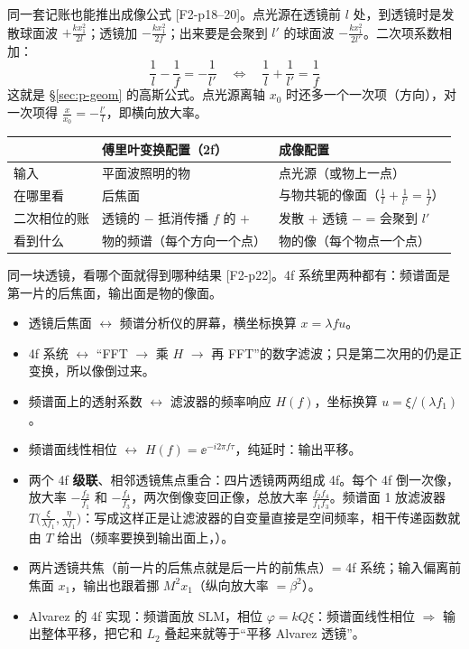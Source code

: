 \label{sec:p-imgacct}
同一套记账也能推出成像公式 [F2-p18–20]。点光源在透镜前 $l$ 处，到透镜时是发散球面波 $+\frac{kx_1^2}{2l}$；透镜加 $-\frac{kx_1^2}{2f}$；出来要是会聚到 $l'$ 的球面波 $-\frac{kx_1^2}{2l'}$。二次项系数相加：
\[
\frac1l-\frac1f=-\frac1{l'}\quad\Longleftrightarrow\quad\frac1l+\frac1{l'}=\frac1f
\]
这就是 §\ref{sec:p-geom} 的高斯公式。点光源离轴 $x_0$ 时还多一个一次项（方向），对一次项得 $\frac{x}{x_0}=-\frac{l'}{l}$，即横向放大率。
\begin{center}\small\renewcommand{\arraystretch}{1.35}
\begin{tabular}{@{}P{3.2cm}P{5.2cm}P{6cm}@{}}
\toprule
 & 傅里叶变换配置（2f） & 成像配置\\ \midrule
输入 & 平面波照明的物 & 点光源（或物上一点）\\
在哪里看 & 后焦面 & 与物共轭的像面（$\frac1l+\frac1{l'}=\frac1f$）\\
二次相位的账 & 透镜的 $-$ 抵消传播 $f$ 的 $+$ & 发散 $+$ 透镜 $-$ = 会聚到 $l'$\\
看到什么 & 物的频谱（每个方向一个点） & 物的像（每个物点一个点）\\
\bottomrule
\end{tabular}
\end{center}
同一块透镜，看哪个面就得到哪种结果 [F2-p22]。4f 系统里两种都有：频谱面是第一片的后焦面，输出面是物的像面。

\begin{idea}[类比]
\begin{itemize}
\item 透镜后焦面 $\leftrightarrow$ 频谱分析仪的屏幕，横坐标换算 $x=\lambda fu$。
\item 4f 系统 $\leftrightarrow$ “FFT $\to$ 乘 $H$ $\to$ 再 FFT”的数字滤波；只是第二次用的仍是正变换，所以像倒过来。
\item 频谱面上的透射系数 $\leftrightarrow$ 滤波器的频率响应 $H(f)$，坐标换算 $u=\xi/(\lambda f_1)$。
\item 频谱面线性相位 $\leftrightarrow$ $H(f)=\ee^{-i2\pi f\tau}$，纯延时：输出平移。
\end{itemize}
\end{idea}

\pkao
\begin{itemize}
\item 两个 4f \textbf{级联}、相邻透镜焦点重合：四片透镜两两组成 4f。每个 4f 倒一次像，放大率 $-\frac{f_2}{f_1}$ 和 $-\frac{f_4}{f_3}$，两次倒像变回正像，总放大率 $\frac{f_2f_4}{f_1f_3}$。频谱面 1 放滤波器 $T\big(\frac{\xi}{\lambda f_1},\frac{\eta}{\lambda f_1}\big)$：写成这样正是让滤波器的自变量直接是空间频率，相干传递函数就由 $T$ 给出（频率要换到输出面上，\pageref{ex:v-4f2}）。
\item 两片透镜共焦（前一片的后焦点就是后一片的前焦点）= 4f 系统；输入偏离前焦面 $x_1$，输出也跟着挪 $M^2x_1$（纵向放大率 $=\beta^2$）。
\item Alvarez 的 4f 实现：频谱面放 SLM，相位 $\varphi=kQ\xi$：频谱面线性相位 $\Rightarrow$ 输出整体平移，把它和 $L_2$ 叠起来就等于“平移 Alvarez 透镜”。
\end{itemize}

